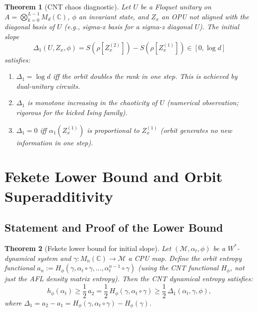 \documentclass[12pt,a4paper]{article}
\newtheorem{theorem}{Theorem}[section]
\newcommand{\CC}{\mathbb{C}}
\newcommand{\Mn}{M_n(\CC)}
\newcommand{\Md}{M_d(\CC)}
\newcommand{\vN}{\mathcal{M}}      %
\newcommand{\Hphi}{H_{\phi}}
\begin{document}
\begin{theorem}[CNT chaos diagnostic]\label{thm:cnt_chaos_diagnostic}
Let $U$ be a Floquet unitary on $A=\bigotimes_{k=0}^{L-1}\Md$, $\phi$ an invariant
state, and $Z_x$ an OPU not aligned with the diagonal basis of $U$ (e.g., sigma-x basis
for a sigma-z diagonal $U$).  The initial slope
\begin{equation}\label{eq:cnt_chaos_diagnostic}
  \Delta_1(U,Z_x,\phi)
  = S(\rho[Z_x^{(2)}]) - S(\rho[Z_x^{(1)}])
  \in [0,\log d]
\end{equation}
satisfies:
\begin{enumerate}
\item[(a)] $\Delta_1=\log d$ iff the orbit doubles the rank in one step.
  This is achieved by dual-unitary circuits.
\item[(b)] $\Delta_1$ is monotone increasing in the chaoticity of $U$
  (numerical observation; rigorous for the kicked Ising family).
\item[(c)] $\Delta_1=0$ iff $\alpha_1(Z_x^{(1)})$ is proportional to $Z_x^{(1)}$
  (orbit generates no new information in one step).
\end{enumerate}
\end{theorem}

\section{Fekete Lower Bound and Orbit Superadditivity}
\label{sec:fekete_lb}

\subsection{Statement and Proof of the Lower Bound}

\begin{theorem}[Fekete lower bound for initial slope]\label{thm:fekete_lb}
Let $(\vN,\alpha_t,\phi)$ be a $W^*$-dynamical system and $\gamma:\Mn\to\vN$ a CPU map.
Define the orbit entropy functional $a_n := \Hphi(\gamma,\alpha_t\circ\gamma,\ldots,\alpha_t^{n-1}\circ\gamma)$
(using the CNT functional $H_\phi$, not just the AFL density matrix entropy).
Then the CNT dynamical entropy satisfies:
\begin{equation}\label{eq:fekete_lb}
  h_\phi(\alpha_t) \ge \frac{1}{2}\,a_2
  = \frac{1}{2}\,\Hphi(\gamma,\alpha_t\circ\gamma)
  \ge \frac{1}{2}\,\Delta_1(\alpha_t,\gamma,\phi),
\end{equation}
where $\Delta_1 = a_2 - a_1 = \Hphi(\gamma,\alpha_t\circ\gamma) - \Hphi(\gamma)$.
\end{theorem}
\end{document}
